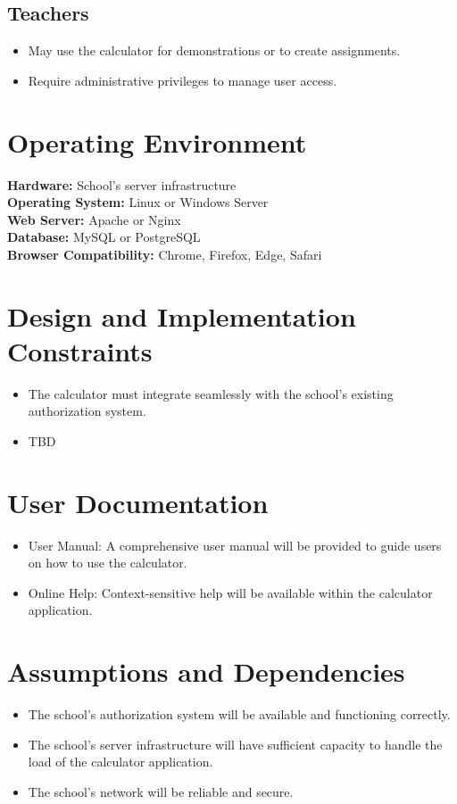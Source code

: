 \documentclass{scrreprt}
\begin{document}
\subsection*{Teachers}
\begin{itemize}
    \item May use the calculator for demonstrations or to create assignments.
    \item Require administrative privileges to manage user access.
\end{itemize}

\section{Operating Environment}
{\bf Hardware:} School's server infrastructure\\
{\bf Operating System:} Linux or Windows Server\\
{\bf Web Server:} Apache or Nginx\\
{\bf Database:} MySQL or PostgreSQL\\
{\bf Browser Compatibility:} Chrome, Firefox, Edge, Safari\\

\section{Design and Implementation Constraints}
\begin{itemize}
    \item The calculator must integrate seamlessly with the school's existing authorization system.
    \item TBD
\end{itemize}

\section{User Documentation}

\begin{itemize}
    \item User Manual: A comprehensive user manual will be provided to guide users on how to use the calculator.
    \item Online Help: Context-sensitive help will be available within the calculator application.
\end{itemize}

\section{Assumptions and Dependencies}
\begin{itemize}
    \item The school's authorization system will be available and functioning correctly.
    \item The school's server infrastructure will have sufficient capacity to handle the load of the calculator application.
    \item The school's network will be reliable and secure.
\end{itemize}
\end{document}
